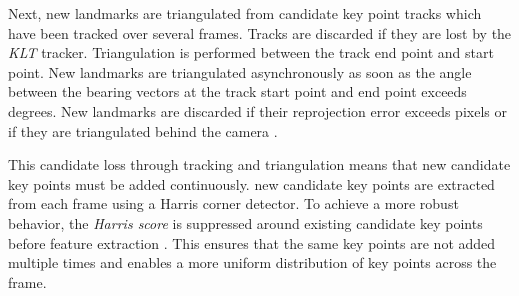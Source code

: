 Next, new landmarks are triangulated from candidate key point tracks which have been tracked over several frames. 
Tracks are discarded if they are lost by the \emph{KLT} tracker.
Triangulation is performed between the track end point and start point. 
New landmarks are triangulated asynchronously as soon as the angle between the bearing vectors at the track start point and end point exceeds \triangulationAngleThreshold degrees. 
New landmarks are discarded if their reprojection error exceeds \triangulationMaxReprError pixels or if they are triangulated behind the camera . \par 
This candidate loss through tracking and triangulation means that new candidate key points must be added continuously. 
\addCandidateEachFrame new candidate key points are extracted from each frame using a Harris corner detector. 
To achieve a more robust behavior, the \emph{Harris score} is suppressed around existing candidate key points before feature extraction . This ensures that the same key points are not added multiple times and enables a more uniform distribution of key points across the frame.